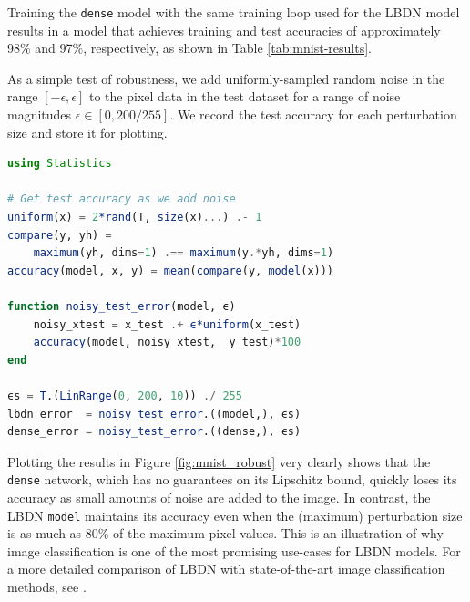Training the \verb|dense| model with the same training loop used for the LBDN model results in a model that achieves training and test accuracies of approximately 98\% and 97\%, respectively, as shown in Table \ref{tab:mnist-results}.

\begin{table} [ht]
\label{tab:mnist-results}
\end{table}

As a simple test of robustness, we add uniformly-sampled random noise in the range $[-\epsilon, \epsilon]$ to the pixel data in the test dataset for a range of noise magnitudes $\epsilon \in [0, 200/255].$ We record the test accuracy for each perturbation size and store it for plotting.
\begin{lstlisting}[language = Julia]
using Statistics

# Get test accuracy as we add noise
uniform(x) = 2*rand(T, size(x)...) .- 1
compare(y, yh) = 
    maximum(yh, dims=1) .== maximum(y.*yh, dims=1)
accuracy(model, x, y) = mean(compare(y, model(x)))
    
function noisy_test_error(model, ϵ)
    noisy_xtest = x_test .+ ϵ*uniform(x_test)
    accuracy(model, noisy_xtest,  y_test)*100
end

ϵs = T.(LinRange(0, 200, 10)) ./ 255
lbdn_error  = noisy_test_error.((model,), ϵs)
dense_error = noisy_test_error.((dense,), ϵs)
\end{lstlisting}

Plotting the results in Figure \ref{fig:mnist_robust} very clearly shows that the \verb|dense| network, which has no guarantees on its Lipschitz bound, quickly loses its accuracy as small amounts of noise are added to the image. In contrast, the LBDN \verb|model| maintains its accuracy even when the (maximum) perturbation size is as much as 80\% of the maximum pixel values. This is an illustration of why image classification is one of the most promising use-cases for LBDN models. For a more detailed comparison of LBDN with state-of-the-art image classification methods, see \cite{Wang+Manchester2023}.

